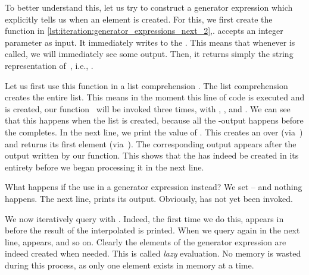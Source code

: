 %
\afterpage{\clearpage}%
%
To better understand this, let us try to construct a generator expression which explicitly tells us when an element is created.
For this, we first create the function  in \cref{lst:iteration:generator_expressions_next_2},.
 accepts an integer parameter  as input.
It immediately writes  to the .
This means that whenever  is called, we will immediately see some output.
Then, it returns simply the string representation of~, i.e., .

Let us first use this function in a list comprehension .
The list comprehension creates the entire list.
This means in the moment this line of code is executed and  is created, our function~ will be invoked three times, with , , and .
We can see that this happens when the list is created, because all the -output happens before the  completes.
In the next line, we print the value of .
This creates an  over  (via~) and returns its first element (via~).
The corresponding output appears after the output written by our  function.
This shows that the  has indeed be created in its entirety before we began processing it in the next line.%
%
\begin{sloppypar}%
What happens if the use  in a generator expression instead?
We set  -- and nothing happens.
The next line,  prints its output.
Obviously,  has not yet been invoked.%
\end{sloppypar}%
%
We now iteratively query  with .
Indeed, the first time we do this,  appears in  before the result of the interpolated   is printed.
When we query  again in the next line,  appears, and so on.
Clearly the elements of the generator expression are indeed created when needed.
This is called \emph{lazy} evaluation.
No memory is wasted during this process, as only one element exists in memory at a time.


